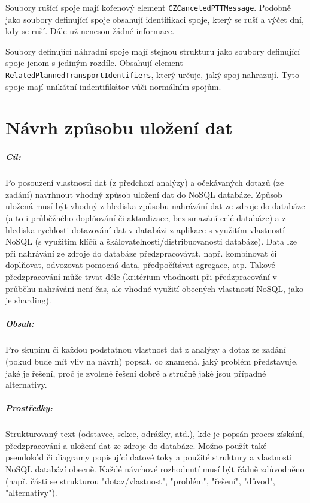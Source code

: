 \documentclass[10pt,xcolor=pdflatex,dvipsnames,table,oneside]{book}
\begin{document}
Soubory rušící spoje mají kořenový element \verb|CZCanceledPTTMessage|. Podobně jako soubory definující spoje obsahují identifikaci spoje, který se ruší
a výčet dní, kdy se ruší. Dále už nenesou žádné informace.

Soubory definující náhradní spoje mají stejnou strukturu jako soubory definující spoje jenom s jediným rozdíle. Obsahují element
\verb|RelatedPlannedTransportIdentifiers|, který určuje, jaký spoj nahrazují. Tyto spoje mají unikátní indentifikátor vůči
normálním spojům.

\chapter{Návrh způsobu uložení dat}

\paragraph{Cíl:}
Po posouzení vlastností dat (z předchozí analýzy) a očekávaných dotazů (ze zadání) navrhnout vhodný způsob uložení dat do NoSQL databáze.
Způsob uložená musí být vhodný z hlediska způsobu nahrávání dat ze zdroje do databáze (a to i průběžného doplňování či aktualizace, bez smazání celé databáze)
a z hlediska rychlosti dotazování dat v databázi z aplikace s využitím vlastností NoSQL (s využitím klíčů a škálovatelnosti/distribuovanosti databáze).
Data lze při nahrávání ze zdroje do databáze předzpracovávat, např. kombinovat či doplňovat, odvozovat pomocná data, předpočítávat agregace, atp.
Takové předzpracování může trvat déle (kritérium vhodnosti při předzpracování v průběhu nahrávání není čas, ale vhodné využití obecných vlastností NoSQL, jako je sharding).

\paragraph{Obsah:}
Pro skupinu či každou podstatnou vlastnost dat z analýzy a dotaz ze zadání (pokud bude mít vliv na návrh) popsat,
co znamená, jaký problém představuje, jaké je řešení, proč je zvolené řešení dobré a stručně jaké jsou případné alternativy.

\paragraph{Prostředky:}
Strukturovaný text (odstavce, sekce, odrážky, atd.), kde je popsán proces získání, předzpracování a uložení dat ze zdroje do databáze.
Možno použít také pseudokód či diagramy popisující datové toky a použité struktury a vlastnosti NoSQL databází obecně.
Každé návrhové rozhodnutí musí být řádně zdůvodněno (např. části se strukturou "dotaz/vlastnost", "problém", "řešení", "důvod", "alternativy").
\end{document}

